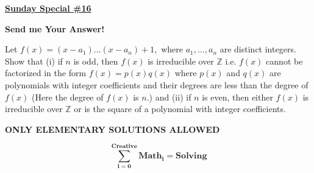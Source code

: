 \documentclass[12pt]{article}
\begin{document}
	
	\color{blue}
	\begin{center}
		\thispagestyle{empty}
		\color{blue}
		
		{\fontsize{40}{20}\selectfont\textbf{\underline{Sunday Special \#16}}}
		
		\vspace*{1cm}
		
		{\fontsize{35}{30}\selectfont\textbf{Send me Your Answer!}}
		\vspace*{1cm}
	\end{center}
	
	{\fontsize{30}{30}\selectfont Let $f(x)=\left(x-a_{1}\right) \ldots\left(x-a_{n}\right)+1,$ where $a_{1}, \ldots, a_{n}$ are distinct integers. Show that (i) if $n$ is odd, then $f(x)$ is irreducible over $\mathbb{Z}$ i.e. $f(x)$ cannot be factorized in the form $f(x)=p(x) q(x)$ where $p(x)$ and $q(x)$ are polynomials with integer coefficients and their degrees are less than the degree of $f(x)$ (Here the degree of $f(x)$ is $n$.) and (ii) if $n$ is even, then either $f(x)$ is irreducible over $\mathbb{Z}$ or is the square of a polynomial with integer coefficients.}
	
	\vspace{1cm}
	\begin{center}	
		{\fontsize{30}{30}\textbf{ONLY ELEMENTARY SOLUTIONS ALLOWED}}
		
		\vspace{1cm}
		
		{\fontsize{50}{60}\selectfont 
			
			$$\boldsymbol{\sum \limits_{i=0}^{Creative} Math_i = Solving}$$}
		
		
	\end{center}
\end{document}
